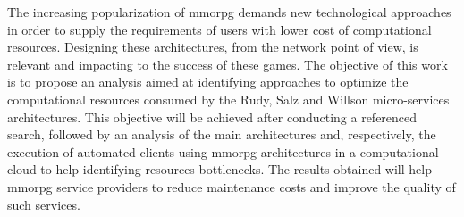 The increasing popularization of \acf{mmorpg} demands new technological approaches in order to supply the requirements of users with lower cost of computational resources.
%
Designing these architectures, from the network point of view, is relevant and impacting to the success of these games.
%
The objective of this work is to propose an analysis aimed at identifying approaches to optimize the computational resources consumed by the Rudy, Salz and Willson micro-services architectures.
%
This objective will be achieved after conducting a referenced search, followed by an analysis of the main architectures and, respectively, the execution of automated clients using \ac{mmorpg} architectures in a computational cloud to help identifying resources bottlenecks.
%
The results obtained will help \ac{mmorpg} service providers to reduce maintenance costs and improve the quality of such services. \\
